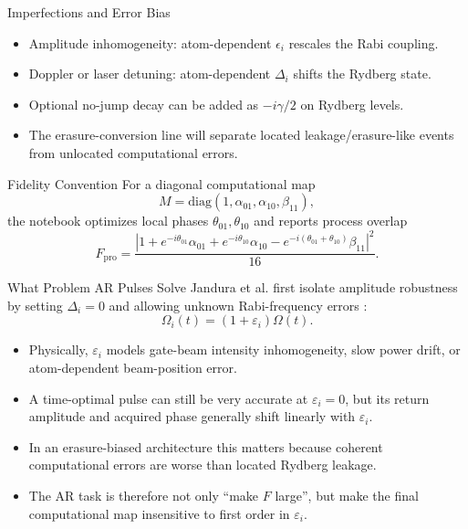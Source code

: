 \documentclass[aspectratio=169]{beamer}
\begin{document}
\begin{frame}{Imperfections and Error Bias}
  \begin{itemize}
    \item Amplitude inhomogeneity: atom-dependent \(\epsilon_i\) rescales the Rabi coupling.
    \item Doppler or laser detuning: atom-dependent \(\Delta_i\) shifts the Rydberg state.
    \item Optional no-jump decay can be added as \(-i\gamma/2\) on Rydberg levels.
    \item The erasure-conversion line will separate located leakage/erasure-like events from unlocated computational errors.
  \end{itemize}
\end{frame}

\begin{frame}{Fidelity Convention}
  For a diagonal computational map
  \[
    M = \mathrm{diag}(1, \alpha_{01}, \alpha_{10}, \beta_{11}),
  \]
  the notebook optimizes local phases \(\theta_{01},\theta_{10}\) and reports process overlap
  \[
    F_{\mathrm{pro}} =
      \frac{\left|1
      + e^{-i\theta_{01}}\alpha_{01}
      + e^{-i\theta_{10}}\alpha_{10}
      - e^{-i(\theta_{01}+\theta_{10})}\beta_{11}\right|^2}{16}.
  \]
\end{frame}

\begin{frame}{What Problem AR Pulses Solve}
  Jandura et al. first isolate amplitude robustness by setting
  \(\Delta_i=0\) and allowing unknown Rabi-frequency errors \cite{janduraOptimizingRydbergGates2023}:
  \[
    \Omega_i(t)=(1+\varepsilon_i)\Omega(t).
  \]
  \begin{itemize}
    \item Physically, \(\varepsilon_i\) models gate-beam intensity inhomogeneity, slow power drift, or atom-dependent beam-position error.
    \item A time-optimal pulse can still be very accurate at \(\varepsilon_i=0\), but its return amplitude and acquired phase generally shift linearly with \(\varepsilon_i\).
    \item In an erasure-biased architecture this matters because coherent computational errors are worse than located Rydberg leakage.
    \item The AR task is therefore not only ``make \(F\) large'', but make the final computational map insensitive to first order in \(\varepsilon_i\).
  \end{itemize}
\end{frame}
\end{document}
